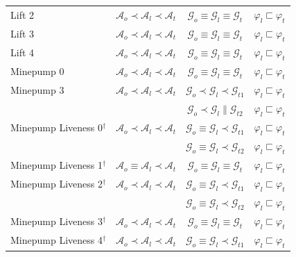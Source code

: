\begin{table}[h]
\begin{tabular*}{\linewidth}{@{\extracolsep{\fill}}lccc@{}}
Lift 2 & $\mathcal{A}_{o}\prec\mathcal{A}_{l}\prec\mathcal{A}_{t}$ & $\mathcal{G}_{o}\equiv\mathcal{G}_{l}\equiv\mathcal{G}_{t}$ & $\varphi_l\sqsubset \varphi_t$ \\
Lift 3 & $\mathcal{A}_{o}\prec\mathcal{A}_{l}\prec\mathcal{A}_{t}$ & $\mathcal{G}_{o}\equiv\mathcal{G}_{l}\equiv\mathcal{G}_{t}$ & $\varphi_l\sqsubset \varphi_t$ \\
Lift 4 & $\mathcal{A}_{o}\prec\mathcal{A}_{l}\prec\mathcal{A}_{t}$ & $\mathcal{G}_{o}\equiv\mathcal{G}_{l}\equiv\mathcal{G}_{t}$ & $\varphi_l\sqsubset \varphi_t$ \\
\hline
Minepump 0 & $\mathcal{A}_{o}\prec\mathcal{A}_{l}\prec\mathcal{A}_{t}$ & $\mathcal{G}_{o}\equiv\mathcal{G}_{l}\equiv\mathcal{G}_{t}$ & $\varphi_l\sqsubset \varphi_t$ \\
Minepump 3 & $\mathcal{A}_{o}\prec\mathcal{A}_{l}\prec\mathcal{A}_{t}$ & $\mathcal{G}_{o}\prec\mathcal{G}_{l}\prec\mathcal{G}_{t1}$ & $\varphi_l\sqsubset \varphi_t$ \\
 & & $\mathcal{G}_{o}\prec\mathcal{G}_{l}\parallel\mathcal{G}_{t2}$ & $\varphi_l\sqsubset \varphi_t$ \\
\hline
Minepump Liveness 0$^\dagger$ & $\mathcal{A}_{o}\prec\mathcal{A}_{l}\prec\mathcal{A}_{t}$ & $\mathcal{G}_{o}\equiv\mathcal{G}_{l}\prec\mathcal{G}_{t1}$ & $\varphi_l\sqsubset \varphi_t$ \\
 & & $\mathcal{G}_{o}\equiv\mathcal{G}_{l}\prec\mathcal{G}_{t2}$ & $\varphi_l\sqsubset \varphi_t$ \\
Minepump Liveness 1$^\dagger$ & $\mathcal{A}_{o}\equiv\mathcal{A}_{l}\prec\mathcal{A}_{t}$ & $\mathcal{G}_{o}\equiv\mathcal{G}_{l}\equiv\mathcal{G}_{t}$ & $\varphi_l\sqsubset \varphi_t$ \\
Minepump Liveness 2$^\dagger$ & $\mathcal{A}_{o}\prec\mathcal{A}_{l}\prec\mathcal{A}_{t}$ & $\mathcal{G}_{o}\equiv\mathcal{G}_{l}\prec\mathcal{G}_{t1}$ & $\varphi_l\sqsubset \varphi_t$ \\
 & & $\mathcal{G}_{o}\equiv\mathcal{G}_{l}\prec\mathcal{G}_{t2}$ & $\varphi_l\sqsubset \varphi_t$ \\
Minepump Liveness 3$^\dagger$ & $\mathcal{A}_{o}\prec\mathcal{A}_{l}\prec\mathcal{A}_{t}$ & $\mathcal{G}_{o}\equiv\mathcal{G}_{l}\equiv\mathcal{G}_{t}$ & $\varphi_l\sqsubset \varphi_t$ \\
Minepump Liveness 4$^\dagger$ & $\mathcal{A}_{o}\prec\mathcal{A}_{l}\prec\mathcal{A}_{t}$ & $\mathcal{G}_{o}\equiv\mathcal{G}_{l}\prec\mathcal{G}_{t1}$ & $\varphi_l\sqsubset \varphi_t$ \\

\end{tabular*}
\end{table}
